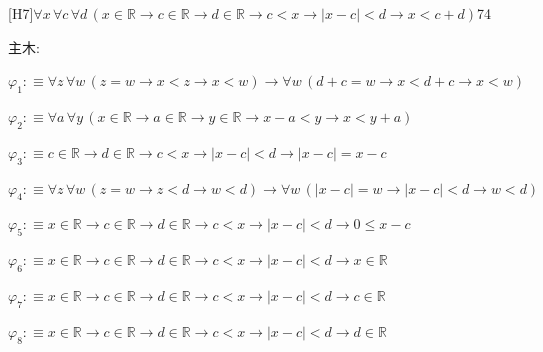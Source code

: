 \begin{fullproof}{[H7]}{$\forall x\,\forall c\,\forall d\,(x \in \mathbb{R} \to c \in \mathbb{R} \to d \in \mathbb{R} \to c < x \to \lvert x - c \rvert < d \to x < c + d)$}{74}
\begin{ptree}
\end{ptree}
\noindent 主木:
\begin{ptree}
\noLine
{}
\end{ptree}
\begin{abbrevlist}
\item $\varphi_{1} :\equiv \forall z\,\forall w\,(z = w \to x < z \to x < w) \to \forall w\,(d + c = w \to x < d + c \to x < w)$
\item $\varphi_{2} :\equiv \forall a\,\forall y\,(x \in \mathbb{R} \to a \in \mathbb{R} \to y \in \mathbb{R} \to x - a < y \to x < y + a)$
\item $\varphi_{3} :\equiv c \in \mathbb{R} \to d \in \mathbb{R} \to c < x \to \lvert x - c \rvert < d \to \lvert x - c \rvert = x - c$
\item $\varphi_{4} :\equiv \forall z\,\forall w\,(z = w \to z < d \to w < d) \to \forall w\,(\lvert x - c \rvert = w \to \lvert x - c \rvert < d \to w < d)$
\item $\varphi_{5} :\equiv x \in \mathbb{R} \to c \in \mathbb{R} \to d \in \mathbb{R} \to c < x \to \lvert x - c \rvert < d \to 0 \leq x - c$
\item $\varphi_{6} :\equiv x \in \mathbb{R} \to c \in \mathbb{R} \to d \in \mathbb{R} \to c < x \to \lvert x - c \rvert < d \to x \in \mathbb{R}$
\item $\varphi_{7} :\equiv x \in \mathbb{R} \to c \in \mathbb{R} \to d \in \mathbb{R} \to c < x \to \lvert x - c \rvert < d \to c \in \mathbb{R}$
\item $\varphi_{8} :\equiv x \in \mathbb{R} \to c \in \mathbb{R} \to d \in \mathbb{R} \to c < x \to \lvert x - c \rvert < d \to d \in \mathbb{R}$

\end{abbrevlist}
\end{fullproof}
